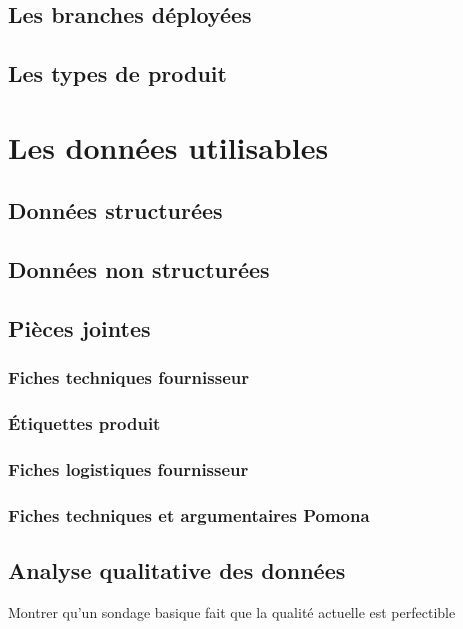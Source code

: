 \documentclass{report}
\begin{document}
        \section{Les branches déployées}
        \section{Les types de produit}
        \section{}
    \chapter{Les données utilisables}
        \section{Données structurées}
        \section{Données non structurées}
        \section{Pièces jointes}
            \subsection{Fiches techniques fournisseur}
            \subsection{\'{E}tiquettes produit}
            \subsection{Fiches logistiques fournisseur}
            \subsection{Fiches techniques et argumentaires Pomona}
        \section{Analyse qualitative des données}
        
        Montrer qu'un sondage basique fait que la qualité actuelle est perfectible
\end{document}
